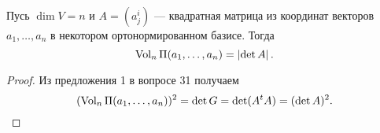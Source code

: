\begin{corollary}
    Пусь $\dim V = n$ и $A = (a^i_j)$ --- квадратная матрица из координат векторов $a_1, \ldots, a_n$ в некотором ортонормированном базисе. Тогда
    \[
        \operatorname{Vol}_n\Pi(a_1, \ldots, a_n) = \left\lvert\det A\right\rvert.
    \]
\end{corollary}

\begin{proof}
    Из предложения 1 в вопросе 31 получаем
    \[
        (\operatorname{Vol}_n\Pi(a_1, \ldots, a_n))^2 = \det G = \det(A^tA) = (\det A)^2.
    \]
\end{proof}


